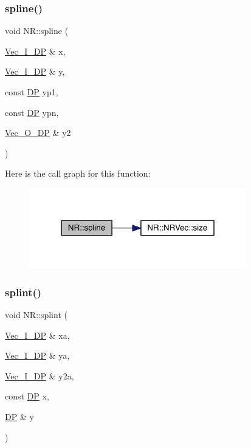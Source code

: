 \mbox{\label{namespaceNR_a5c106df532661250db9a1edaec21e355}} 
\subsubsection{\texorpdfstring{spline()}{spline()}}
{\footnotesize\ttfamily void N\+R\+::spline (\begin{DoxyParamCaption}\item[{\mbox{\hyperlink{namespaceNR_a9f943da53862537c552e2a770cb170ae}{Vec\+\_\+\+I\+\_\+\+DP}} \&}]{x,  }\item[{\mbox{\hyperlink{namespaceNR_a9f943da53862537c552e2a770cb170ae}{Vec\+\_\+\+I\+\_\+\+DP}} \&}]{y,  }\item[{const \mbox{\hyperlink{namespaceNR_af6ff762dd605ff477b8e52387253a02a}{DP}}}]{yp1,  }\item[{const \mbox{\hyperlink{namespaceNR_af6ff762dd605ff477b8e52387253a02a}{DP}}}]{ypn,  }\item[{\mbox{\hyperlink{namespaceNR_a970094d23441f8ef6a45282a7eb2103d}{Vec\+\_\+\+O\+\_\+\+DP}} \&}]{y2 }\end{DoxyParamCaption})}

Here is the call graph for this function\+:
\nopagebreak
\begin{figure}[H]
\begin{center}
\leavevmode
\includegraphics[width=268pt]{da/d46/namespaceNR_a5c106df532661250db9a1edaec21e355_cgraph}
\end{center}
\end{figure}
\mbox{\label{namespaceNR_af17868718dea0cf57360a9a84b1bf76f}} 
\subsubsection{\texorpdfstring{splint()}{splint()}}
{\footnotesize\ttfamily void N\+R\+::splint (\begin{DoxyParamCaption}\item[{\mbox{\hyperlink{namespaceNR_a9f943da53862537c552e2a770cb170ae}{Vec\+\_\+\+I\+\_\+\+DP}} \&}]{xa,  }\item[{\mbox{\hyperlink{namespaceNR_a9f943da53862537c552e2a770cb170ae}{Vec\+\_\+\+I\+\_\+\+DP}} \&}]{ya,  }\item[{\mbox{\hyperlink{namespaceNR_a9f943da53862537c552e2a770cb170ae}{Vec\+\_\+\+I\+\_\+\+DP}} \&}]{y2a,  }\item[{const \mbox{\hyperlink{namespaceNR_af6ff762dd605ff477b8e52387253a02a}{DP}}}]{x,  }\item[{\mbox{\hyperlink{namespaceNR_af6ff762dd605ff477b8e52387253a02a}{DP}} \&}]{y }\end{DoxyParamCaption})}

